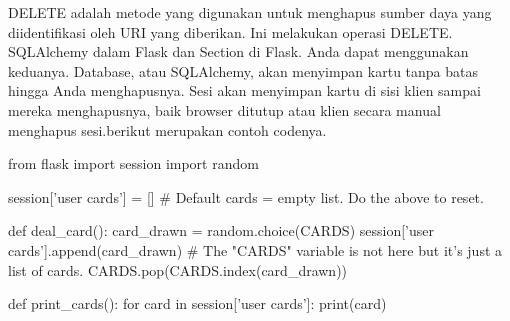 DELETE adalah metode yang digunakan untuk menghapus sumber daya yang diidentifikasi oleh URI yang diberikan. Ini melakukan operasi DELETE\cite{alemu2014rest}.
SQLAlchemy dalam Flask dan Section di Flask. Anda dapat menggunakan keduanya. Database, atau SQLAlchemy, akan menyimpan kartu tanpa batas hingga Anda menghapusnya. Sesi akan menyimpan kartu di sisi klien sampai mereka menghapusnya, baik browser ditutup atau klien secara manual menghapus sesi.berikut merupakan contoh codenya.

from flask import session
import random

session['user cards'] = []
# Default cards = empty list. Do the above to reset.

def deal_card():
  card_drawn = random.choice(CARDS)
  session['user cards'].append(card_drawn)
  # The "CARDS" variable is not here but it's just a list of cards.
  CARDS.pop(CARDS.index(card_drawn))

def print_cards():
  for card in session['user cards']:
    print(card)
